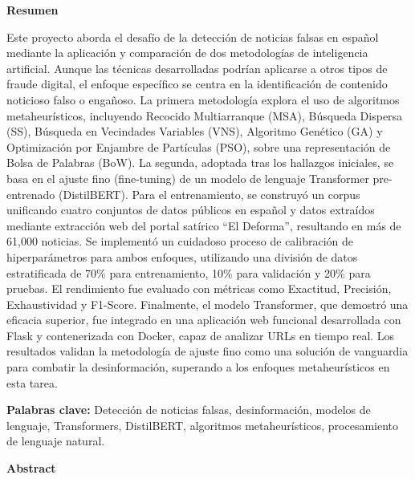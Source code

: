 \thispagestyle{plain}  
\vspace{0.9cm}
\textbf{{\Large Resumen}}
\vspace{0.9cm}

Este proyecto aborda el desafío de la detección de noticias falsas en español mediante la aplicación y comparación de dos metodologías de inteligencia artificial. Aunque las técnicas desarrolladas podrían aplicarse a otros tipos de fraude digital, el enfoque específico se centra en la identificación de contenido noticioso falso o engañoso. La primera metodología explora el uso de algoritmos metaheurísticos, incluyendo Recocido Multiarranque (MSA), Búsqueda Dispersa (SS), Búsqueda en Vecindades Variables (VNS), Algoritmo Genético (GA) y Optimización por Enjambre de Partículas (PSO), sobre una representación de Bolsa de Palabras (BoW). La segunda, adoptada tras los hallazgos iniciales, se basa en el ajuste fino (fine-tuning) de un modelo de lenguaje Transformer pre-entrenado (DistilBERT). Para el entrenamiento, se construyó un corpus unificando cuatro conjuntos de datos públicos en español y datos extraídos mediante extracción web del portal satírico ``El Deforma'', resultando en más de 61,000 noticias. Se implementó un cuidadoso proceso de calibración de hiperparámetros para ambos enfoques, utilizando una división de datos estratificada de 70\% para entrenamiento, 10\% para validación y 20\% para pruebas. El rendimiento fue evaluado con métricas como Exactitud, Precisión, Exhaustividad y F1-Score. Finalmente, el modelo Transformer, que demostró una eficacia superior, fue integrado en una aplicación web funcional desarrollada con Flask y contenerizada con Docker, capaz de analizar URLs en tiempo real. Los resultados validan la metodología de ajuste fino como una solución de vanguardia para combatir la desinformación, superando a los enfoques metaheurísticos en esta tarea.

\vspace{0.9cm}
\textbf{Palabras clave:} Detección de noticias falsas, desinformación, modelos de lenguaje, Transformers, DistilBERT, algoritmos metaheurísticos, procesamiento de lenguaje natural.

\shipout\null
\newpage

\thispagestyle{plain}  
\vspace{0.9cm}
\textbf{{\Large Abstract}}
\vspace{0.9cm}

